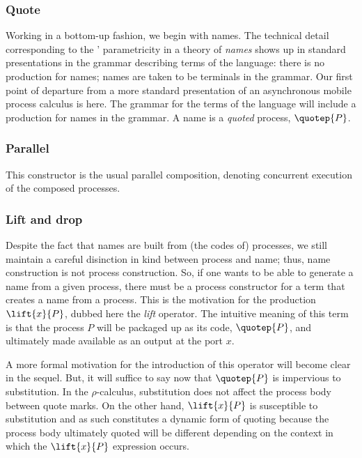 \subsubsection{Quote}

Working in a bottom-up fashion, we begin with names. The technical
detail corresponding to the {\pic}' parametricity in a theory of
\textit{names} shows up in standard presentations in the grammar
describing terms of the language: there is no production for names;
names are taken to be terminals in the grammar. Our first point of
departure from a more standard presentation of an asynchronous mobile
process calculus is here. The grammar for the terms of the language
will include a production for names in the grammar. A name is a
\textit{quoted} process, $\quotep{P}$.

\subsubsection{Parallel}

This constructor is the usual parallel composition, denoting
concurrent execution of the composed processes.

\subsubsection{Lift and drop}
Despite the fact that names are built from (the codes of) processes,
we still maintain a careful disinction in kind between process and
name; thus, name construction is not process construction. So, if one
wants to be able to generate a name from a given process, there must
be a process constructor for a term that creates a name from a
process. This is the motivation for the production $\lift{x}{P}$,
dubbed here the \emph{lift} operator. The intuitive meaning of this
term is that the process $P$ will be packaged up as its code,
$\quotep{P}$, and ultimately made available as an output at the port
$x$.

A more formal motivation for the introduction of this operator will
become clear in the sequel. But, it will suffice to say now that
$\quotep{P}$ is impervious to substitution. In the $\rho$-calculus,
substitution does not affect the process body between quote marks. On
the other hand, $\lift{x}{P}$ is susceptible to substitution and as
such constitutes a dynamic form of quoting because the process body
ultimately quoted will be different depending on the context in which
the $\lift{x}{P}$ expression occurs.

